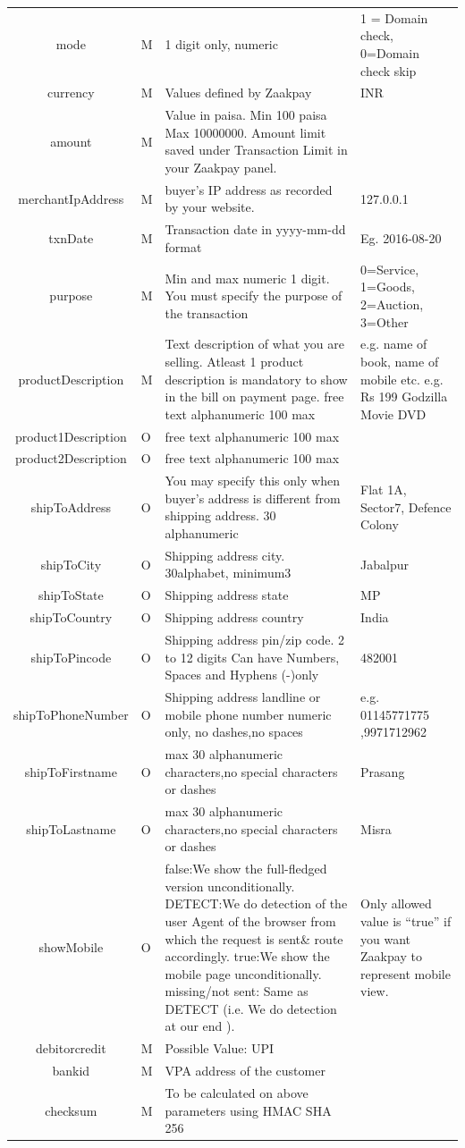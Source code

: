\documentclass{article}
\begin{document}
\begin{longtable}{||c|| p{2.09cm}|| p{5.5cm} || p{4.7cm}||}
mode & M & 1 digit only, numeric & 1 = Domain check, 0=Domain check skip\\
currency & M & Values defined by Zaakpay & INR\\
amount & M & Value in paisa. Min 100 paisa Max 10000000. Amount limit saved under Transaction Limit in your Zaakpay panel. & \\
merchantIpAddress & M & buyer's IP address as recorded by your website. & 127.0.0.1 \\
txnDate & M & Transaction date in yyyy-mm-dd format & Eg. 2016-08-20 \\
purpose & M & Min and max numeric 1 digit. You must specify the purpose of the transaction & 0=Service, 1=Goods, 2=Auction, 3=Other\\
productDescription & M & Text description of what you are selling. Atleast 1 product description is mandatory to show in the bill on payment page. free text alphanumeric 100 max & e.g. name of book, name of mobile etc. e.g. Rs 199 Godzilla Movie DVD \\
product1Description & O & free text alphanumeric 100 max & \\
product2Description & O & free text alphanumeric 100 max & \\
shipToAddress & O & You may specify this only when buyer's address is different from shipping address. 30 alphanumeric & Flat 1A, Sector7, Defence Colony \\
shipToCity & O & Shipping address city. 30alphabet, minimum3 & Jabalpur \\
shipToState & O & Shipping address state & MP \\
shipToCountry & O & Shipping address country & India \\

shipToPincode & O & Shipping address pin/zip code. 2 to 12 digits Can have Numbers, Spaces and Hyphens (-)only & 482001\\
shipToPhoneNumber & O & Shipping address landline or mobile phone number numeric only, no dashes,no spaces & e.g. 01145771775 ,9971712962\\
shipToFirstname & O & max 30 alphanumeric characters,no  special characters or dashes & Prasang\\
shipToLastname & O & max 30 alphanumeric characters,no  special characters or dashes & Misra\\
showMobile & O & false:We show the full-fledged version unconditionally. DETECT:We do detection of the user Agent of the browser from which the request is sent\& route accordingly. true:We show the mobile page unconditionally. missing/not sent: Same as DETECT (i.e. We do detection at our end ). & Only allowed value is “true” if you want Zaakpay to represent mobile view.\\
debitorcredit & M & Possible Value: UPI & \\
bankid & M  & VPA address of the customer & \\
checksum & M & To be calculated on above parameters using HMAC SHA 256 & \\
\end{longtable}
\end{document}
